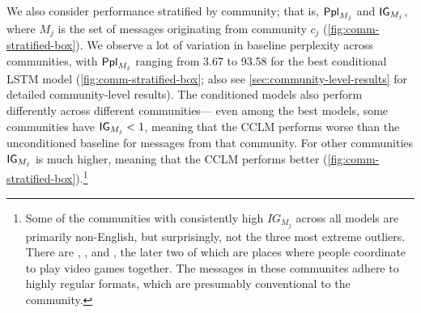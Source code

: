 \documentclass[11pt]{article}
\begin{document}
We also consider performance stratified by community; that is,
$\mathsf{Ppl}_{M_j}$ and $\mathsf{IG}_{M_j}$, 
where $M_j$ is the set of messages originating from community $c_j$ 
(\cref{fig:comm-stratified-box}).
We observe a lot of variation in baseline perplexity
across communities, with $\mathsf{Ppl}_{M_j}$ ranging from \num{3.67} to
\num{93.58} for the best conditional LSTM model 
(\cref{fig:comm-stratified-box}; also see \cref{sec:community-level-results} for detailed community-level results). 
The conditioned models also perform differently across different communities---%
even among the best models, some communities have $\mathsf{IG}_{M_j} < 1$,
meaning that the CCLM performs worse than the unconditioned baseline for 
messages from that community.
For other communities $\mathsf{IG}_{M_j}$ is much higher, meaning that the CCLM performs better  
(\cref{fig:comm-stratified-box}).\footnote{
  Some of the communities with consistently high $IG_{M_j}$ 
  across all models are primarily non-English, 
  but surprisingly, not the three most extreme
  outliers. There are , , and , 
  the later two of which are places where people coordinate to play video games
  together. The messages in these communites adhere to highly regular formats, 
  which are presumably conventional to the community.}
%
\end{document}
